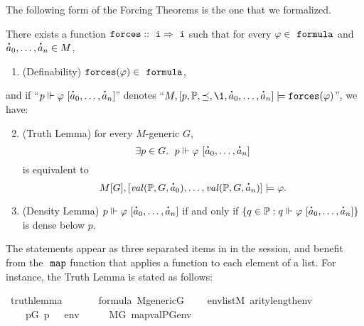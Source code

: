The following form of the Forcing Theorems  is the one
that we formalized.
\begin{theorem}\label{th:forcing-thms}
  There exists a function  $\forceisa:: \tyi \fun  \tyi$
  such that for every
  $\phi\in\formula$ and $\punto{a}_0,\dots,\punto{a}_n\in M$,
  \begin{enumerate}
  \item\label{item:definability} (Definability)
    $\forceisa(\phi)\in\formula$,
  \end{enumerate}
  and if
  “$p \forces \phi\ [\punto{a}_0,\dots,\punto{a}_n]$”
  denotes
  “$M, [p,\PP,\preceq,\1, \punto{a}_0,\dots,\punto{a}_n]  \models
  \forceisa(\phi)$”, we have:
  \begin{enumerate}
    \setcounter{enumi}{1}
  \item\label{item:truth-lemma} (Truth Lemma) for every $M$-generic $G$,
    \[
      \exists p\in G.\ \; p \forces \phi\ [\punto{a}_0,\dots,\punto{a}_n]
    \]
    is equivalent to 
    \[
      M[G], [\val(\PP,G,\punto{a}_0),\dots,\val(\PP,G,\punto{a}_n)]
      \models \phi.
    \]
  \item \label{item:density-lemma} (Density Lemma) $p \forces \phi\ [\punto{a}_0,\dots,\punto{a}_n]$
    if and only if 
    $\{q\in \PP :  q \forces \phi\ [\punto{a}_0,\dots,\punto{a}_n]\}$
    is dense below $p$.
  \end{enumerate}
\end{theorem}
The statements appear as three separated items in
 in the  session,
and benefit from the $\isatt{map}$ function that applies a function to
each element of a list. For instance, the Truth Lemma is stated as
follows:
\begin{isabelle}
\isamarkupfalse%
\ truth{\isacharunderscore}{\kern0pt}lemma{\isacharcolon}{\kern0pt}\isanewline
\ \ \isanewline
\ \ \ \ {\isachardoublequoteopen}{\isasymphi}{\isasymin}formula{\isachardoublequoteclose}\ {\isachardoublequoteopen}M{\isacharunderscore}{\kern0pt}generic{\isacharparenleft}{\kern0pt}G{\isacharparenright}{\kern0pt}{\isachardoublequoteclose}\isanewline
\ \ \ \ {\isachardoublequoteopen}env{\isasymin}list{\isacharparenleft}{\kern0pt}M{\isacharparenright}{\kern0pt}{\isachardoublequoteclose}\ {\isachardoublequoteopen}arity{\isacharparenleft}{\kern0pt}{\isasymphi}{\isacharparenright}{\kern0pt}{\isasymle}length{\isacharparenleft}{\kern0pt}env{\isacharparenright}{\kern0pt}{\isachardoublequoteclose}\isanewline
\ \ \isanewline
\ \ \ \ {\isachardoublequoteopen}{\isacharparenleft}{\kern0pt}{\isasymexists}p{\isasymin}G{\isachardot}{\kern0pt}\ p\ {\isasymtturnstile}\ {\isasymphi}\ env{\isacharparenright}{\kern0pt}\ \ \ {\isasymlongleftrightarrow}\ \ \ M{\isacharbrackleft}{\kern0pt}G{\isacharbrackright}{\kern0pt}{\isacharcomma}{\kern0pt}\ map{\isacharparenleft}{\kern0pt}val{\isacharparenleft}{\kern0pt}P{\isacharcomma}{\kern0pt}G{\isacharparenright}{\kern0pt}{\isacharcomma}{\kern0pt}env{\isacharparenright}{\kern0pt}\ {\isasymTurnstile}\ {\isasymphi}{\isachardoublequoteclose}
\end{isabelle}

